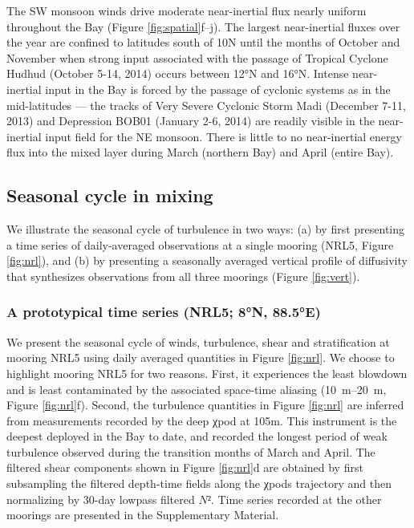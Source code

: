 \documentclass[onecol]{ametsoc}
\begin{document}
The SW monsoon winds drive moderate near-inertial flux nearly uniform throughout the Bay (Figure \ref{fig:spatial}f--j).
The largest near-inertial fluxes over the year are confined to latitudes south of 10N until the months of October and November when strong input associated with the passage of Tropical Cyclone Hudhud (October 5-14, 2014) occurs between 12°N and 16°N.
Intense near-inertial input in the Bay is forced by the passage of cyclonic systems as in the mid-latitudes \citep{Alford2003} --- the tracks of Very Severe Cyclonic Storm Madi (December 7-11, 2013) and Depression BOB01 (January 2-6, 2014) are readily visible in the near-inertial input field for the NE monsoon.
There is little to no near-inertial energy flux into the mixed layer during March (northern Bay) and April (entire Bay).


\subsection{Seasonal cycle in mixing}

We illustrate the seasonal cycle of turbulence in two ways:
 (a) by first presenting a time series of daily-averaged observations at a single mooring (NRL5, Figure \ref{fig:nrl}), and
 (b) by presenting a seasonally averaged vertical profile of diffusivity that synthesizes observations from all three moorings (Figure \ref{fig:vert}).

\label{sec:orgbcce381}
\subsubsection*{A prototypical time series (NRL5; 8°N, 88.5°E)}
\label{sec:org1c0c44b}
\label{sec:nrl}

We present the seasonal cycle of winds, turbulence, shear and stratification at mooring NRL5 using daily averaged quantities in Figure \ref{fig:nrl}.
We choose to highlight mooring NRL5 for two reasons.
First, it experiences the least blowdown and is least contaminated by the associated space-time aliasing (\SIrange{10}{20}{\meter}, Figure \ref{fig:nrl}f).
Second, the turbulence quantities in Figure \ref{fig:nrl} are inferred from measurements recorded by the deep χpod at 105m.
This instrument is the deepest deployed in the Bay to date, and recorded the longest period of weak turbulence observed during the transition months of March and April.
The filtered shear components shown in Figure \ref{fig:nrl}d are obtained by first subsampling the filtered depth-time fields along the χpods trajectory and then normalizing by 30-day lowpass filtered \(N²\).
Time series recorded at the other moorings are presented in the Supplementary Material.
\end{document}
